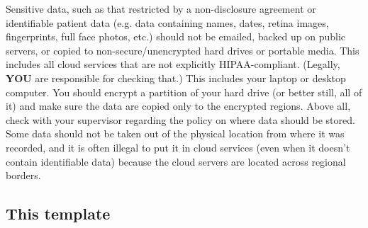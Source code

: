 Sensitive data, such as that restricted by a non-disclosure agreement or identifiable patient data (e.g. data containing names, dates, retina images, fingerprints,
full face photos, etc.) should not be emailed, backed up on public servers, or copied to non-secure/unencrypted hard drives or portable media. This includes all cloud services that are not explicitly HIPAA-compliant. (Legally, {\bf YOU} are responsible for checking that.) This includes your laptop or desktop computer. You should encrypt a partition of your hard drive (or better still, all of it) and make sure the data are copied only to the encrypted regions. 
Above all, check with your supervisor regarding the policy on where data should be stored. Some data should not be taken out of the physical location from where it was recorded, and it is often illegal to put it in cloud services (even when it doesn't contain identifiable data) because the cloud servers are located across regional borders.


\subsection{This template}


